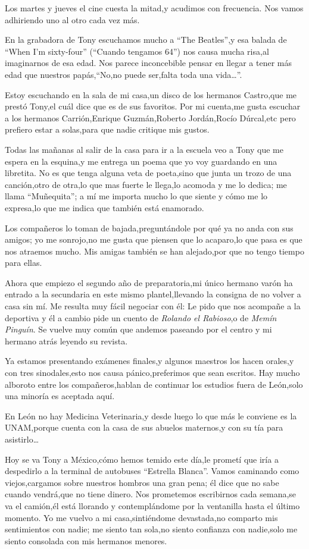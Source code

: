 \documentclass[letterpaper,12pt]{book}
\begin{document}
Los martes y jueves el cine cuesta la mitad,y acudimos con frecuencia. Nos vamos adhiriendo uno al otro cada vez más.

En la grabadora de Tony escuchamos mucho a ``The Beatles'',y esa balada de ``When I'm sixty-four'' (``Cuando tengamos 64'') nos causa mucha risa,al imaginarnos de esa edad. Nos parece inconcebible pensar en llegar a tener más edad que nuestros papás,``No,no puede ser,falta toda una vida\ldots''.

Estoy escuchando en la sala de mi casa,un disco de los hermanos Castro,que me prestó Tony,el cuál dice que es de sus favoritos. Por mi cuenta,me gusta escuchar a los hermanos Carrión,Enrique Guzmán,Roberto Jordán,Rocío Dúrcal,etc pero prefiero estar a solas,para que nadie critique mis gustos.

Todas las mañanas al salir de la casa para ir a la escuela veo a Tony que me espera en la esquina,y me entrega un poema que yo voy guardando en una libretita. No es que tenga alguna veta de poeta,sino que junta un trozo de una canción,otro de otra,lo que mas fuerte le llega,lo acomoda y me lo dedica; me llama ``Muñequita''; a mí me importa mucho lo que siente y cómo me lo expresa,lo que me indica que también está enamorado.

Los compañeros lo toman de bajada,preguntándole por qué ya no anda con sus amigos; yo me sonrojo,no me gusta que piensen que lo acaparo,lo que pasa es que nos atraemos mucho. Mis amigas también se han alejado,por que no tengo tiempo para ellas. 

Ahora que empiezo el segundo año de preparatoria,mi único hermano varón ha entrado a la secundaria en este mismo plantel,llevando la consigna de no volver a casa sin mí. Me resulta muy fácil negociar con él: Le pido que nos acompañe a la deportiva y él a cambio pide un cuento de \textit{Rolando el Rabioso},o de \textit{Memín Pinguín}. Se vuelve muy común que andemos paseando por el centro y mi hermano atrás leyendo su revista.


Ya estamos presentando exámenes finales,y algunos maestros los hacen orales,y con tres sinodales,esto nos causa pánico,preferimos que sean escritos. Hay mucho alboroto entre los compañeros,hablan de continuar los estudios fuera de León,solo una minoría es aceptada aquí.

En León no hay Medicina Veterinaria,y desde luego lo que más le conviene es la UNAM,porque cuenta con la casa de sus abuelos maternos,y con su tía para asistirlo\ldots

Hoy se va Tony a México,cómo hemos temido este día,le prometí que iría a despedirlo a la terminal de autobuses ``Estrella Blanca''. Vamos caminando como viejos,cargamos sobre nuestros hombros una gran pena; él dice que no sabe cuando vendrá,que no tiene dinero. Nos prometemos escribirnos cada semana,se va el camión,él está llorando y contemplándome por la ventanilla hasta el último momento. Yo me vuelvo a mi casa,sintiéndome devastada,no comparto mis sentimientos con nadie; me siento tan sola,no siento confianza con nadie,solo me siento consolada con mis hermanos menores. 
\end{document}
